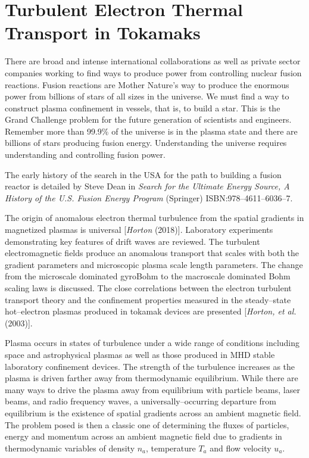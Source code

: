 \documentclass[a4paper,openany,12pt]{book}
\begin{document}
\chapter{Turbulent Electron Thermal Transport in Tokamaks}

There are broad and intense international collaborations as well as private sector companies working to find ways to produce power from controlling nuclear fusion reactions. Fusion reactions are Mother Nature's way to produce the enormous power from billions of stars of all sizes in the universe. We must find a way to construct plasma confinement in vessels, that is, to build a star. This is the Grand Challenge problem for the future generation of scientists and engineers. Remember more than 99.9\% of the universe is in the plasma state and there are billions of stars producing fusion energy. Understanding the universe requires understanding and controlling fusion power. 

The early history of the search in the USA for the path to building a fusion reactor is detailed by Steve Dean in \emph{Search for the Ultimate Energy Source, A History of the U.S. Fusion Energy Program} (Springer) ISBN:978--4611--6036--7.

The origin of anomalous electron thermal turbulence from the spatial gradients in magnetized plasmas is universal [\emph{Horton} (2018)]. Laboratory experiments demonstrating key features of drift waves are reviewed. The turbulent electromagnetic fields produce an anomalous transport that scales with both the gradient parameters and microscopic plasma scale length parameters. The change from the microscale dominated gyroBohm to the macroscale dominated Bohm scaling laws is discussed. The close correlations between the electron turbulent transport theory and the confinement properties measured in the steady--state hot--electron plasmas produced in tokamak devices are presented [\emph{Horton, et al.} (2003)].

Plasma occurs in states of turbulence under a wide range of conditions including space and astrophysical plasmas as well as those produced in MHD stable laboratory confinement devices. The strength of the turbulence increases as the plasma is driven farther away from thermodynamic equilibrium. While there are many ways to drive the plasma away from equilibrium with particle beams, laser beams, and radio frequency waves, a universally--occurring departure from equilibrium is the existence of spatial gradients across an ambient magnetic field. The problem posed is then a classic one of determining the fluxes of particles, energy and momentum across an ambient magnetic field due to gradients in thermodynamic variables of density $n_a$, temperature $T_a$ and flow velocity $u_a$.
\end{document}
